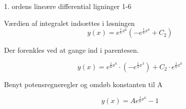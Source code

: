 \documentclass{article}
\begin{document}
\begin{exercise}{1. ordens lineære differential ligninger 1-6}
	\hint
	
	Værdien af integralet indsættes i løsningen
	\[
	y(x) = e^{\frac{1}{6}x^6} \left( -e^{\frac{1}{6}x^6} + C_2\right)
	\]
	
	\hint
	
	Der forenkles ved at gange ind i parentesen.
	
	\hint
	\[
	y(x) = e^{\frac{1}{6}x^6} \cdot \left(-e^{\frac{1}{3}x^3} \right) + C_2 \cdot e^{\frac{1}{6}x^6} 
	\]
	
	\hint
	
	Benyt potensregneregler og omdøb konstanten til A
	
	\hint
	\[
	y(x) = A e^{\frac{1}{6}x^6} - 1
	\]
	
	
\end{exercise}

\newpage
\end{document}
